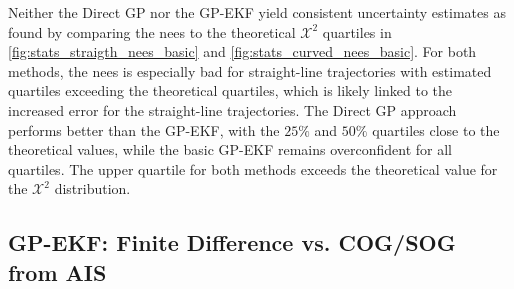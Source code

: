 Neither the Direct GP nor the GP-EKF yield consistent uncertainty estimates as found by comparing the \acrshort{nees} to the theoretical $\mathcal{X}^2$ quartiles in \cref{fig:stats_straigth_nees_basic} and \cref{fig:stats_curved_nees_basic}. For both methods, the \acrshort{nees} is especially bad for straight-line trajectories with estimated quartiles exceeding the theoretical quartiles, which is likely linked to the increased error for the straight-line trajectories. The Direct GP approach performs better than the GP-EKF, with the $25\%$ and $50\%$ quartiles close to the theoretical values, while the basic GP-EKF remains overconfident for all quartiles. The upper quartile for both methods exceeds the theoretical value for the $\mathcal{X}^2$ distribution.

\subsection{GP-EKF: Finite Difference vs. COG/SOG from AIS}

